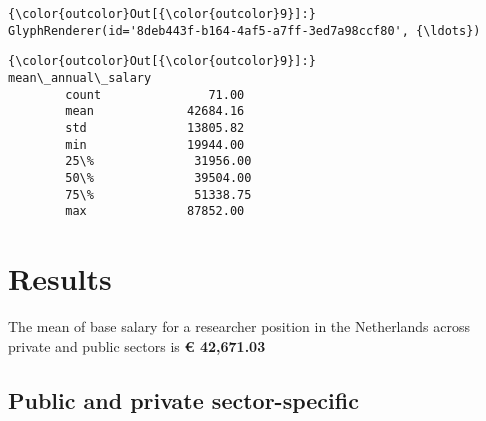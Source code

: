 \documentclass[11pt]{article}
\begin{document}
\begin{Verbatim}[commandchars=\\\{\}]
{\color{outcolor}Out[{\color{outcolor}9}]:} GlyphRenderer(id='8deb443f-b164-4af5-a7ff-3ed7a98ccf80', {\ldots})
\end{Verbatim}
            
    
    
    
    
\begin{Verbatim}[commandchars=\\\{\}]
{\color{outcolor}Out[{\color{outcolor}9}]:}        mean\_annual\_salary
        count               71.00
        mean             42684.16
        std              13805.82
        min              19944.00
        25\%              31956.00
        50\%              39504.00
        75\%              51338.75
        max              87852.00
\end{Verbatim}
            
    \section{Results}\label{results}

    The mean of base salary for a researcher position in the Netherlands
across private and public sectors is \textbf{\euro{} 42,671.03}

    \subsection{Public and private
sector-specific}\label{public-and-private-sector-specific}
\end{document}
